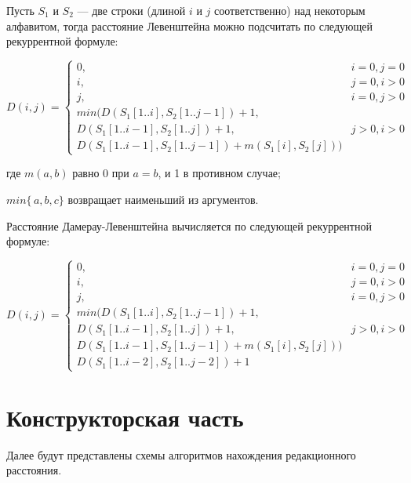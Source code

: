 \documentclass[12pt]{report}
\begin{document}
Пусть $S_{1}$ и $S_{2}$ — две строки (длиной $i$ и $j$ соответственно) над некоторым алфавитом, тогда расстояние Левенштейна можно подсчитать по следующей рекуррентной формуле:


\begin{equation}
	D(i,j) = \left\{ \begin{array}{ll}
		0, & \textrm{$i = 0, j = 0$}\\
		i, & \textrm{$j = 0, i > 0$}\\
		j, & \textrm{$i = 0, j > 0$}\\
		min(D(S_{1}[1..i],S_{2}[1..j-1])+1,\\
		D(S_{1}[1..i-1],S_{2}[1..j]) +1, &\textrm{$j>0, i>0$}\\
		D(S_{1}[1..i-1],S_{2}[1..j-1]) + m(S_{1}[i], S_{2}[j]))
	\end{array}\right.
\end{equation}

где $m(a,b)$ равно 0 при $a=b$, и 1 в противном случае;

 $min\{\,a,b,c\}$ возвращает наименьший из аргументов.


Расстояние Дамерау-Левенштейна вычисляется по следующей рекуррентной формуле:

\begin{equation}
	D(i,j) = \left\{ \begin{array}{ll}
		0, & \textrm{$i = 0, j = 0$}\\
		i, & \textrm{$j = 0, i > 0$}\\
		j, & \textrm{$i = 0, j > 0$}\\
		min(D(S_{1}[1..i],S_{2}[1..j-1])+1,\\
		D(S_{1}[1..i-1],S_{2}[1..j]) +1, &\textrm{$j>0, i>0$}\\
		D(S_{1}[1..i-1],S_{2}[1..j-1]) + m(S_{1}[i], S_{2}[j]))\\
		D(S_{1}[1..i-2],S_{2}[1..j-2]) + 1
	\end{array}\right.
\end{equation}
	
	\chapter{Конструкторская часть}
Далее будут представлены схемы алгоритмов нахождения редакционного расстояния. 

\end{document}
